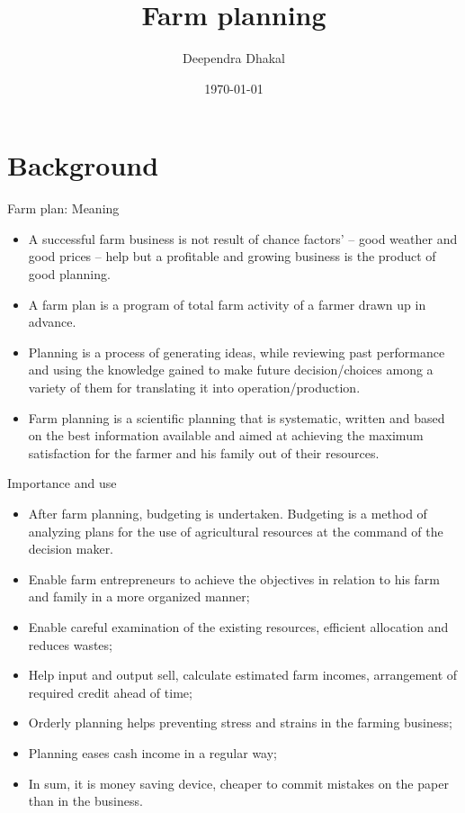 \documentclass[12pt,ignorenonframetext,aspectratio=169]{beamer}
\title{\insertsectionhead}
  {
    \definecolor{white}{rgb}{0.776,0.357,0.157}
    \definecolor{iqss@orange}{rgb}{1,1,1}
    \ifnum \insertmainframenumber > \insertframenumber
    \frame{
      \frametitle{\iqsssectiontitleheader}
      \tableofcontents[currentsection]
    }
    \else
    \frame{
      \frametitle{Backup Slides}
      \tableofcontents[sectionstyle=shaded/shaded,subsectionstyle=shaded/shaded/shaded]
    }
    \fi
  }
\title[]{Farm planning}
\author[
        Deependra Dhakal
    ]{Deependra Dhakal}
\institute[
    ]{
    GAASC, Baitadi \and Tribhuwan University
    }
\date[
      \today
  ]{
      \today
        }
\providecommand{\tightlist}{%
  \setlength{\itemsep}{0pt}\setlength{\parskip}{0pt}}
\begin{document}
  \begin{frame}[plain]
  \titlepage
  \end{frame}



\hypertarget{background}{%
\section{Background}\label{background}}

\begin{frame}{Farm plan: Meaning}
\protect\hypertarget{farm-plan-meaning}{}
\begin{itemize}
\tightlist
\item
  A successful farm business is not result of chance factors' -- good
  weather and good prices -- help but a profitable and growing business
  is the product of good planning.
\item
  A farm plan is a program of total farm activity of a farmer drawn up
  in advance.
\item
  Planning is a process of generating ideas, while reviewing past
  performance and using the knowledge gained to make future
  decision/choices among a variety of them for translating it into
  operation/production.
\item
  Farm planning is a scientific planning that is systematic, written and
  based on the best information available and aimed at achieving the
  maximum satisfaction for the farmer and his family out of their
  resources.
\end{itemize}
\end{frame}

\begin{frame}{Importance and use}
\protect\hypertarget{importance-and-use}{}
\begin{itemize}
\tightlist
\item
  After farm planning, budgeting is undertaken. Budgeting is a method of
  analyzing plans for the use of agricultural resources at the command
  of the decision maker.
\item
  Enable farm entrepreneurs to achieve the objectives in relation to his
  farm and family in a more organized manner;
\item
  Enable careful examination of the existing resources, efficient
  allocation and reduces wastes;
\item
  Help input and output sell, calculate estimated farm incomes,
  arrangement of required credit ahead of time;
\item
  Orderly planning helps preventing stress and strains in the farming
  business;
\item
  Planning eases cash income in a regular way;
\item
  In sum, it is money saving device, cheaper to commit mistakes on the
  paper than in the business.
\end{itemize}
\end{frame}
\end{document}
